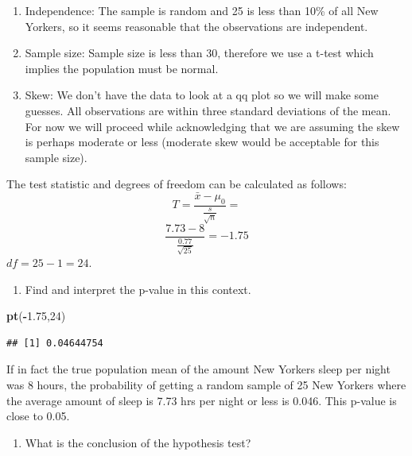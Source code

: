 \documentclass[
]{book}
\newenvironment{Shaded}{\begin{snugshade}}{\end{snugshade}}
\newcommand{\DecValTok}[1]{\textcolor[rgb]{0.00,0.00,0.81}{#1}}
\newcommand{\FloatTok}[1]{\textcolor[rgb]{0.00,0.00,0.81}{#1}}
\newcommand{\KeywordTok}[1]{\textcolor[rgb]{0.13,0.29,0.53}{\textbf{#1}}}
\newcommand{\NormalTok}[1]{#1}
\newcommand{\OperatorTok}[1]{\textcolor[rgb]{0.81,0.36,0.00}{\textbf{#1}}}
\providecommand{\tightlist}{%
  \setlength{\itemsep}{0pt}\setlength{\parskip}{0pt}}
\begin{document}
\begin{enumerate}
\def\labelenumi{\arabic{enumi}.}
\tightlist
\item
  Independence: The sample is random and 25 is less than 10\% of all New Yorkers, so it seems reasonable that the observations are independent.\\
\item
  Sample size: Sample size is less than 30, therefore we use a t-test which implies the population must be normal.\\
\item
  Skew: We don't have the data to look at a qq plot so we will make some guesses. All observations are within three standard deviations of the mean. For now we will proceed while acknowledging that we are assuming the skew is perhaps moderate or less (moderate skew would be acceptable for this sample size).
\end{enumerate}

The test statistic and degrees of freedom can be calculated as follows:
\[T = \frac{\bar{x} - \mu_0}{\frac{s}{\sqrt{n}}}  = \]
\[\frac{7.73 - 8}{\frac{0.77}{\sqrt{25}}} = - 1.75\]
\(df = 25 - 1 = 24\).

\begin{enumerate}
\def\labelenumi{\alph{enumi}.}
\setcounter{enumi}{2}
\tightlist
\item
  Find and interpret the p-value in this context.
\end{enumerate}

\begin{Shaded}
\begin{Highlighting}[]
\KeywordTok{pt}\NormalTok{(}\OperatorTok{-}\FloatTok{1.75}\NormalTok{,}\DecValTok{24}\NormalTok{)}
\end{Highlighting}
\end{Shaded}

\begin{verbatim}
## [1] 0.04644754
\end{verbatim}

If in fact the true population mean of the amount New Yorkers sleep per night was 8 hours, the probability of getting a random sample of 25 New Yorkers where the average amount of sleep is 7.73 hrs per night or less is 0.046. This p-value is close to 0.05.

\begin{enumerate}
\def\labelenumi{\alph{enumi}.}
\setcounter{enumi}{3}
\tightlist
\item
  What is the conclusion of the hypothesis test?
\end{enumerate}
\end{document}
